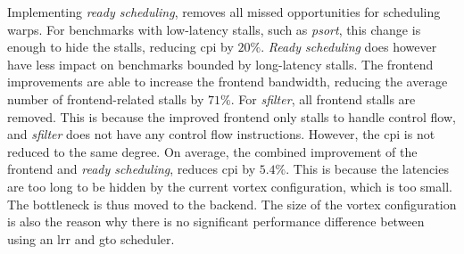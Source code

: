 Implementing \textit{ready scheduling}, removes all missed opportunities for scheduling warps. For benchmarks with low-latency stalls, such as \textit{psort}, this change is enough to hide the stalls, reducing \acrshort{cpi} by $20\%$. \textit{Ready scheduling} does however have less impact on benchmarks bounded by long-latency stalls. The frontend improvements are able to increase the frontend bandwidth, reducing the average number of frontend-related stalls by $71\%$. For \textit{sfilter}, all frontend stalls are removed. This is because the improved frontend only stalls to handle control flow, and \textit{sfilter} does not have any control flow instructions. However, the \acrshort{cpi} is not reduced to the same degree. On average, the combined improvement of the frontend and \textit{ready scheduling}, reduces \acrshort{cpi} by $5.4\%$. This is because the latencies are too long to be hidden by the current \Gls{vortex} configuration, which is too small. The bottleneck is thus moved to the backend. The size of the \Gls{vortex} configuration is also the reason why there is no significant performance difference between using an \acrshort{lrr} and \acrshort{gto} scheduler.